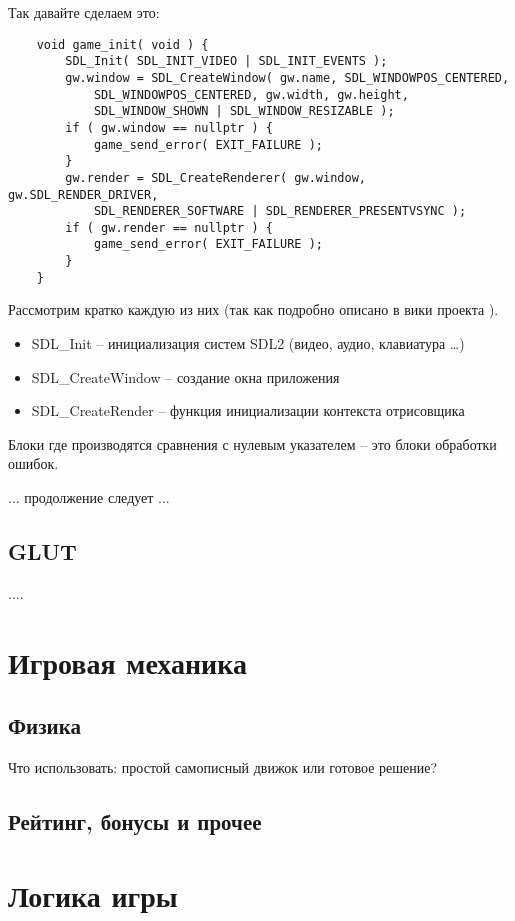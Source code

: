 Так давайте сделаем это:

\begin{lstlisting}
    void game_init( void ) {
        SDL_Init( SDL_INIT_VIDEO | SDL_INIT_EVENTS );
        gw.window = SDL_CreateWindow( gw.name, SDL_WINDOWPOS_CENTERED, 
            SDL_WINDOWPOS_CENTERED, gw.width, gw.height, 
            SDL_WINDOW_SHOWN | SDL_WINDOW_RESIZABLE );
        if ( gw.window == nullptr ) {
            game_send_error( EXIT_FAILURE );
        }
        gw.render = SDL_CreateRenderer( gw.window, gw.SDL_RENDER_DRIVER, 
            SDL_RENDERER_SOFTWARE | SDL_RENDERER_PRESENTVSYNC );
        if ( gw.render == nullptr ) {
            game_send_error( EXIT_FAILURE );
        }
    }
\end{lstlisting}

Рассмотрим кратко каждую из них (так как подробно описано в вики проекта \cite{sdl2wiki}).

\begin{itemize}
    \item SDL\_Init -- инициализация систем SDL2 (видео, аудио, клавиатура \ldots)
    \item SDL\_CreateWindow -- создание окна приложения
    \item SDL\_CreateRender -- функция инициализации контекста отрисовщика
\end{itemize}

Блоки где производятся сравнения с нулевым указателем -- это блоки обработки ошибок.

... продолжение следует ...

\subsection{GLUT}
....

\section{Игровая механика}
\subsection{Физика}
Что использовать: простой самописный движок или готовое решение?
\subsection{Рейтинг, бонусы и прочее}
\section{Логика игры}
